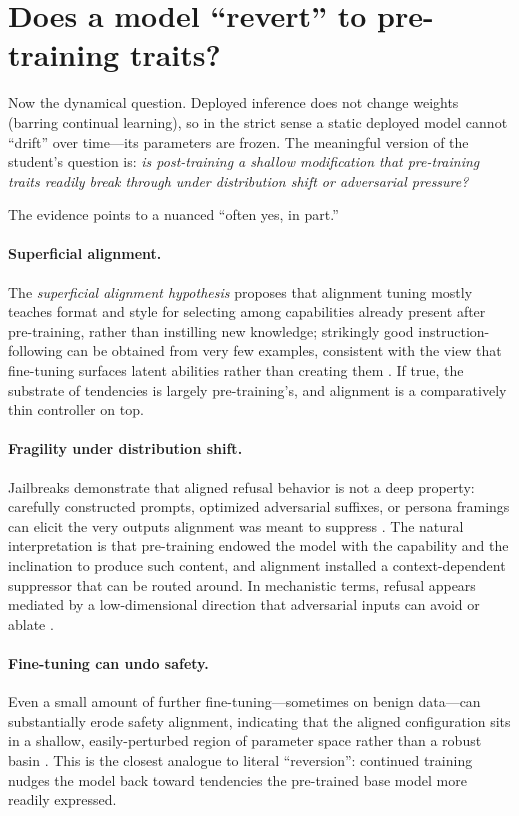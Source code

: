 \documentclass[11pt]{article}
\begin{document}
\section{Does a model ``revert'' to pre-training traits?}
Now the dynamical question. Deployed inference does not change weights (barring continual learning), so in the strict sense a static deployed model cannot ``drift'' over time---its parameters are frozen. The meaningful version of the student's question is: \emph{is post-training a shallow modification that pre-training traits readily break through under distribution shift or adversarial pressure?}

The evidence points to a nuanced ``often yes, in part.''

\paragraph{Superficial alignment.} The \emph{superficial alignment hypothesis} proposes that alignment tuning mostly teaches format and style for selecting among capabilities already present after pre-training, rather than instilling new knowledge; strikingly good instruction-following can be obtained from very few examples, consistent with the view that fine-tuning surfaces latent abilities rather than creating them \citep{zhou2023lima}. If true, the substrate of tendencies is largely pre-training's, and alignment is a comparatively thin controller on top.

\paragraph{Fragility under distribution shift.} Jailbreaks demonstrate that aligned refusal behavior is not a deep property: carefully constructed prompts, optimized adversarial suffixes, or persona framings can elicit the very outputs alignment was meant to suppress \citep{wei2023jailbroken,zou2023universal}. The natural interpretation is that pre-training endowed the model with the capability and the inclination to produce such content, and alignment installed a context-dependent suppressor that can be routed around. In mechanistic terms, refusal appears mediated by a low-dimensional direction that adversarial inputs can avoid or ablate \citep{arditi2024refusal}.

\paragraph{Fine-tuning can undo safety.} Even a small amount of further fine-tuning---sometimes on benign data---can substantially erode safety alignment, indicating that the aligned configuration sits in a shallow, easily-perturbed region of parameter space rather than a robust basin \citep{qi2023finetuning}. This is the closest analogue to literal ``reversion'': continued training nudges the model back toward tendencies the pre-trained base model more readily expressed.
\end{document}
